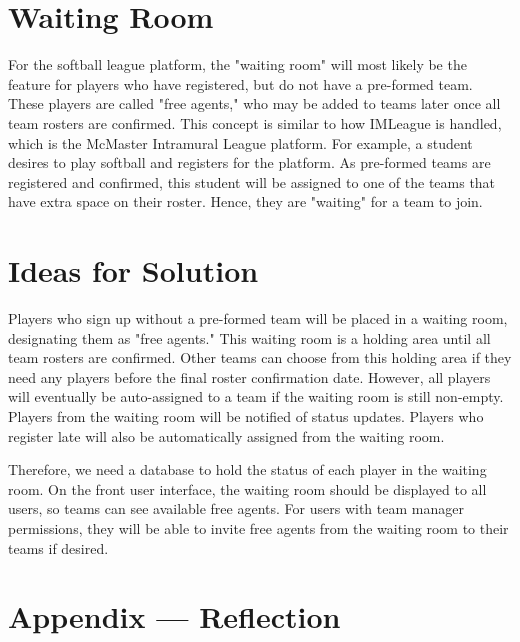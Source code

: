 \documentclass[12pt, titlepage]{article}
\begin{document}
\section{Waiting Room}
For the softball league platform, the "waiting room" will most likely be the feature for players who have registered, but do not have a pre-formed team. These players are called "free agents," who may be added to teams later once all team rosters are confirmed. This concept is similar to how IMLeague is handled, which is the McMaster Intramural League platform. For example, a student desires to play softball and registers for the platform. As pre-formed teams are registered and confirmed, this student will be assigned to one of the teams that have extra space on their roster. Hence, they are "waiting" for a team to join.

\section{Ideas for Solution}
Players who sign up without a pre-formed team will be placed in a waiting room, designating them as "free agents." This waiting room is a holding area until all team rosters are confirmed. Other teams can choose from this holding area if they need any players before the final roster confirmation date. However, all players will eventually be auto-assigned to a team if the waiting room is still non-empty. Players from the waiting room will be notified of status updates. Players who register late will also be automatically assigned from the waiting room.

Therefore, we need a database to hold the status of each player in the waiting room. On the front user interface, the waiting room should be displayed to all users, so teams can see available free agents. For users with team manager permissions, they will be able to invite free agents from the waiting room to their teams if desired.


\newpage{}
\section*{Appendix --- Reflection}




\end{document}
